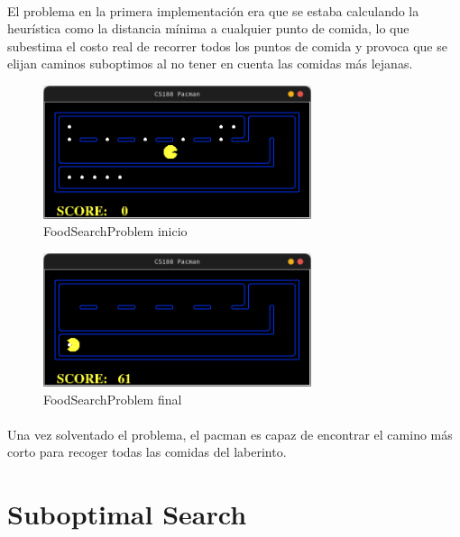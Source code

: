 \documentclass{report}
\begin{document}
          \paragraph*{}{
            El problema en la primera implementación era que se estaba calculando la heurística como la distancia mínima a cualquier punto de comida, lo que subestima el costo real de recorrer todos los puntos de comida y provoca que se elijan caminos suboptimos al no tener en cuenta las comidas más lejanas.\\
          }
          \begin{figure}[H]
            \centering
            \includegraphics[width=0.7\textwidth]{.img/2.7.1.png}
            \caption{FoodSearchProblem inicio}
          \end{figure}
          \begin{figure}[H]
            \centering
            \includegraphics[width=0.7\textwidth]{.img/2.7.2.png}
            \caption{FoodSearchProblem final}
          \end{figure}
          \paragraph*{}{
            Una vez solventado el problema, el pacman es capaz de encontrar el camino más corto para recoger todas las comidas del laberinto.\\
          }
      \clearpage\section{Suboptimal Search}
\end{document}
